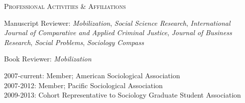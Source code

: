 \documentclass[11pt]{article}
\newcommand{\sectionheader}[1]{
{\Large
\textsc{#1}}
}
\begin{document}
\sectionheader{Professional Activities \& Affiliations}

Manuscript Reviewer: \textit{Mobilization}, \textit{Social Science Research}, \textit{International Journal of Comparative and Applied Criminal Justice}, \textit{Journal of Business Research}, \textit{Social Problems}, \textit{Sociology Compass}

Book Reviewer: \textit{Mobilization}

2007-current:	Member; American Sociological Association\\
2007-2012:	Member; Pacific Sociological Association\\
2009-2013:	Cohort Representative to Sociology Graduate Student Association
\end{document}
